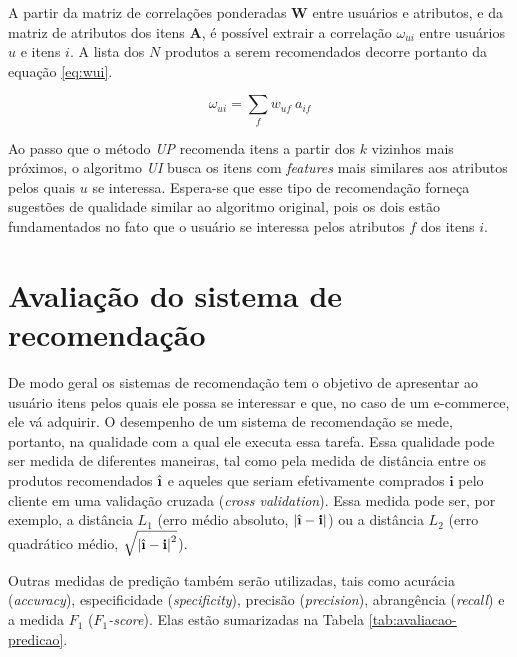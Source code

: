 A partir da matriz de correlações ponderadas $\mathbf{W}$ entre usuários e atributos, e da matriz de atributos dos itens $\mathbf{A}$, é possível extrair a correlação $\omega_{ui}$ entre usuários $u$ e itens $i$. A lista dos $N$ produtos a serem recomendados decorre portanto da equação \ref{eq:wui}.

\begin{equation}
\label{eq:wui} 
    \omega_{ui} = \sum_{f}{w_{uf}~a_{if}}
\end{equation} 

Ao passo que o método \textit{UP} recomenda itens a partir dos $k$ vizinhos mais próximos, o algoritmo \textit{UI} busca os itens com \textit{features} mais similares aos atributos pelos quais $u$ se interessa. Espera-se que esse tipo de recomendação forneça sugestões de qualidade similar ao algoritmo original, pois os dois estão fundamentados no fato que o usuário se interessa pelos atributos $f$ dos itens $i$. 



\section{Avaliação do sistema de recomendação} %
\label{sec:avalia_o_do_sistema_de_recomenda_o}


De modo geral os sistemas de recomendação tem o objetivo de apresentar ao usuário itens pelos quais ele possa se interessar e que, no caso de um e-commerce,  ele vá adquirir. O desempenho de um sistema de recomendação se mede, portanto, na qualidade com a qual ele executa essa tarefa. Essa qualidade pode ser medida de diferentes maneiras, tal como pela medida de distância entre os produtos recomendados $\hat{\textbf{\i}}$ e aqueles que seriam efetivamente comprados $\textbf{i}$ pelo cliente em uma validação cruzada (\textit{cross validation}). Essa medida pode ser, por exemplo, a distância $L_1$ (erro médio absoluto, $\left|\hat{\textbf{\i}} - \textbf{i}\right|$) ou a distância $L_2$ (erro quadrático médio,  $\sqrt{\left|\hat{\textbf{\i}} - \textbf{i}\right|^2}$).

Outras medidas de predição também serão utilizadas, tais como acurácia (\textit{accuracy}), especificidade (\textit{specificity}), precisão (\textit{precision}), abrangência (\textit{recall}) e a medida $F_1$ (\textit{$F_1$-score}). Elas estão sumarizadas na Tabela \ref{tab:avaliacao-predicao}.

